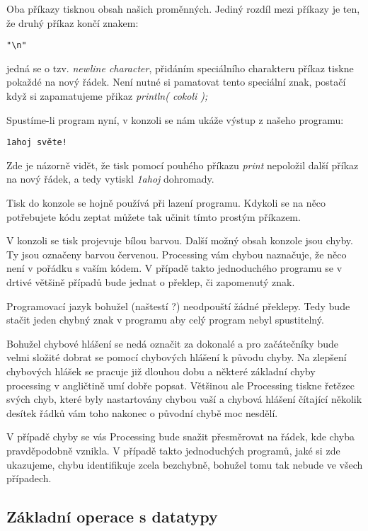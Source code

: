 \documentclass[11pt]{article} %
\begin{document}
Oba příkazy tisknou obsah našich proměnných. Jediný rozdíl mezi příkazy je ten, že druhý příkaz končí znakem:
 
\begin{verbatim}
"\n"
\end{verbatim}

jedná se o tzv. {\em newline character}, přidáním speciálního charakteru příkaz tiskne pokaždé na nový řádek. Není nutné si pamatovat tento speciální znak, postačí když si zapamatujeme přikaz {\em println( cokoli );}

Spustíme-li program nyní, v konzoli se nám ukáže výstup z našeho programu:

\begin{verbatim}
1ahoj světe!
\end{verbatim}

Zde je názorně vidět, že tisk pomocí pouhého příkazu {\em print} nepoložil další příkaz na nový řádek, a tedy vytiskl {\em 1ahoj} dohromady.

Tisk do konzole se hojně používá při lazení programu. Kdykoli se na něco potřebujete kódu zeptat můžete tak učinit tímto prostým příkazem.

V konzoli se tisk projevuje bílou barvou. Další možný obsah konzole jsou chyby. Ty jsou označeny barvou červenou. Processing vám chybou naznačuje, že něco není v pořádku s vaším kódem. V případě takto jednoduchého programu se v drtivé většině případů bude jednat o překlep, či zapomenutý znak.

Programovací jazyk bohužel (naštestí ?) neodpouští žádné překlepy. Tedy bude stačit jeden chybný znak v programu aby celý program nebyl spustitelný.

Bohužel chybové hlášení se nedá označit za dokonalé a pro začátečníky bude velmi složité dobrat se pomocí chybových hlášení k původu chyby. Na zlepšení chybových hlášek se pracuje již dlouhou dobu a některé základní chyby processing v angličtině umí dobře popsat. Většinou ale Processing tiskne řetězec svých chyb, které byly nastartovány chybou vaší a chybová hlášení čítající několik desítek řádků vám toho nakonec o původní chybě moc nesdělí.

V případě chyby se vás Processing bude snažit přesměrovat na řádek, kde chyba pravděpodobně vznikla. V případě takto jednoduchých programů, jaké si zde ukazujeme, chybu identifikuje zcela bezchybně, bohužel tomu tak nebude ve všech případech.


\subsection{Základní operace s datatypy}
\end{document}
